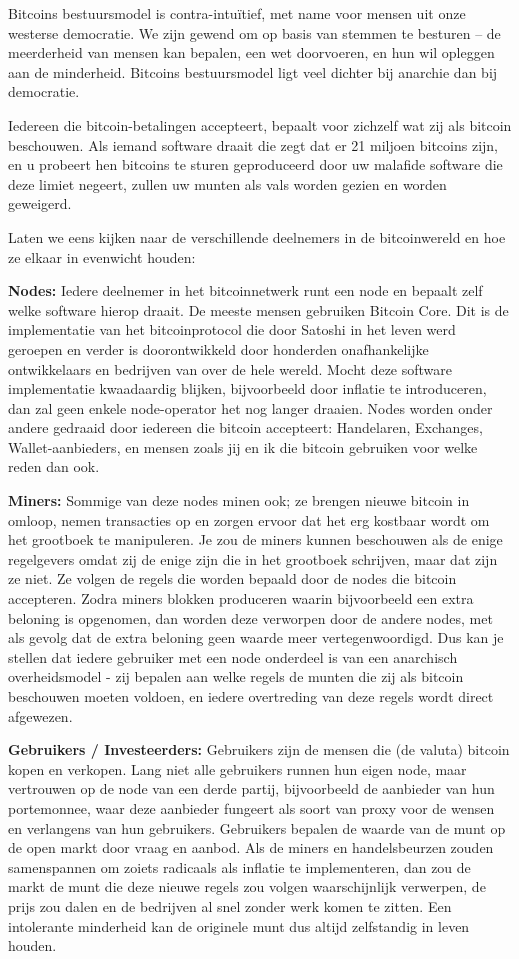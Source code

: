 \documentclass[
  letterpaper,
]{scrbook}
\begin{document}
Bitcoins bestuursmodel is contra-intuïtief, met name voor mensen uit
onze westerse democratie. We zijn gewend om op basis van stemmen te
besturen -- de meerderheid van mensen kan bepalen, een wet doorvoeren,
en hun wil opleggen aan de minderheid. Bitcoins bestuursmodel ligt veel
dichter bij anarchie dan bij democratie.

Iedereen die bitcoin-betalingen accepteert, bepaalt voor zichzelf wat
zij als bitcoin beschouwen. Als iemand software draait die zegt dat er
21 miljoen bitcoins zijn, en u probeert hen bitcoins te sturen
geproduceerd door uw malafide software die deze limiet negeert, zullen
uw munten als vals worden gezien en worden geweigerd.

Laten we eens kijken naar de verschillende deelnemers in de
bitcoinwereld en hoe ze elkaar in evenwicht houden:

\textbf{Nodes:} Iedere deelnemer in het bitcoinnetwerk runt een node en
bepaalt zelf welke software hierop draait. De meeste mensen gebruiken
Bitcoin Core. Dit is de implementatie van het bitcoinprotocol die door
Satoshi in het leven werd geroepen en verder is doorontwikkeld door
honderden onafhankelijke ontwikkelaars en bedrijven van over de hele
wereld. Mocht deze software implementatie kwaadaardig blijken,
bijvoorbeeld door inflatie te introduceren, dan zal geen enkele
node-operator het nog langer draaien. Nodes worden onder andere gedraaid
door iedereen die bitcoin accepteert: Handelaren, Exchanges,
Wallet-aanbieders, en mensen zoals jij en ik die bitcoin gebruiken voor
welke reden dan ook.

\textbf{Miners:} Sommige van deze nodes minen ook; ze brengen nieuwe
bitcoin in omloop, nemen transacties op en zorgen ervoor dat het erg
kostbaar wordt om het grootboek te manipuleren. Je zou de miners kunnen
beschouwen als de enige regelgevers omdat zij de enige zijn die in het
grootboek schrijven, maar dat zijn ze niet. Ze volgen de regels die
worden bepaald door de nodes die bitcoin accepteren. Zodra miners
blokken produceren waarin bijvoorbeeld een extra beloning is opgenomen,
dan worden deze verworpen door de andere nodes, met als gevolg dat de
extra beloning geen waarde meer vertegenwoordigd. Dus kan je stellen dat
iedere gebruiker met een node onderdeel is van een anarchisch
overheidsmodel - zij bepalen aan welke regels de munten die zij als
bitcoin beschouwen moeten voldoen, en iedere overtreding van deze regels
wordt direct afgewezen.

\textbf{Gebruikers / Investeerders:} Gebruikers zijn de mensen die (de
valuta) bitcoin kopen en verkopen. Lang niet alle gebruikers runnen hun
eigen node, maar vertrouwen op de node van een derde partij,
bijvoorbeeld de aanbieder van hun portemonnee, waar deze aanbieder
fungeert als soort van proxy voor de wensen en verlangens van hun
gebruikers. Gebruikers bepalen de waarde van de munt op de open markt
door vraag en aanbod. Als de miners en handelsbeurzen zouden
samenspannen om zoiets radicaals als inflatie te implementeren, dan zou
de markt de munt die deze nieuwe regels zou volgen waarschijnlijk
verwerpen, de prijs zou dalen en de bedrijven al snel zonder werk komen
te zitten. Een intolerante minderheid kan de originele munt dus altijd
zelfstandig in leven houden.
\end{document}
